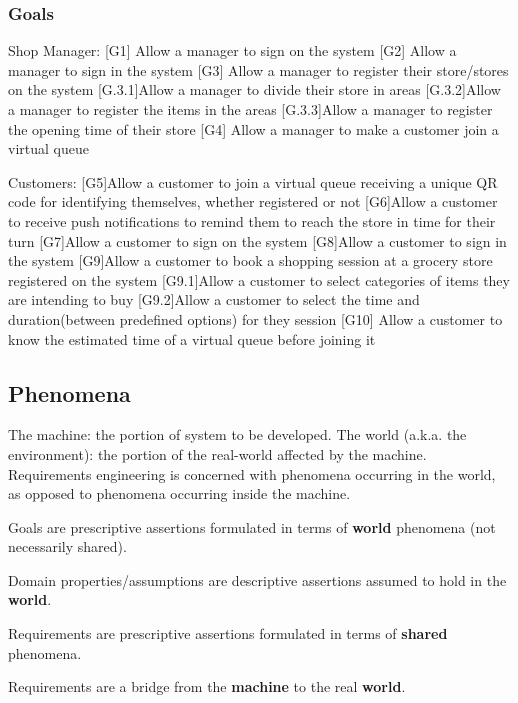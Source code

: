 \subsubsection{Goals}
\label{subsect:goals}

Shop Manager:
[G1] Allow a manager to sign on the system
[G2] Allow a manager to sign in the system
[G3] Allow a manager to register their store/stores on the system
	[G.3.1]Allow a manager to divide their store in areas	
	[G.3.2]Allow a manager to register the items in the areas
	[G.3.3]Allow a manager to register the opening time of their 
		store
[G4] Allow a manager to make a customer join a virtual queue

Customers:
[G5]Allow a customer to join a virtual queue receiving a unique QR code for identifying themselves, whether registered or not
[G6]Allow a customer to receive push notifications to remind them to reach the store in time for their turn
[G7]Allow a customer to sign on the system
[G8]Allow a customer to sign in the system
[G9]Allow a customer to book a shopping session at a grocery store registered on the system
	[G9.1]Allow a customer to select categories of items they are 		intending to 
	buy
	[G9.2]Allow a customer to select the time and duration(between 		predefined options) for they session 	
[G10] Allow a customer to know the estimated time of a virtual queue before		joining it





\subsection{Phenomena}
\label{subsect:phenomena}

The machine: the portion of system to be developed.
The world (a.k.a. the environment): the portion of the real-world affected by the machine.
Requirements engineering is concerned with phenomena occurring in the world, as opposed to phenomena occurring inside the machine.

Goals are prescriptive assertions formulated in terms of \textbf{world} phenomena (not necessarily shared).

Domain properties/assumptions are descriptive assertions assumed to hold in the \textbf{world}.

Requirements are prescriptive assertions formulated in terms of \textbf{shared} phenomena.

Requirements are a bridge from the \textbf{machine} to the real \textbf{world}.


